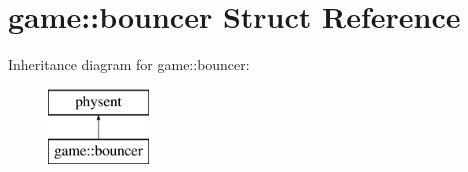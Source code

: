 \hypertarget{structgame_1_1bouncer}{}\section{game\+:\+:bouncer Struct Reference}
\label{structgame_1_1bouncer}
Inheritance diagram for game\+:\+:bouncer\+:\begin{figure}[H]
\begin{center}
\leavevmode
\includegraphics[height=2.000000cm]{structgame_1_1bouncer}
\end{center}
\end{figure}
